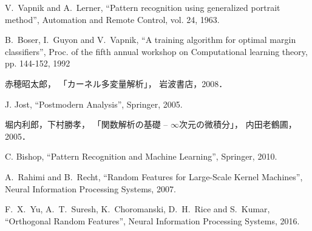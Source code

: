 %


\begin{thebibliography}{9}

V.~Vapnik and A.~Lerner,
``Pattern recognition using generalized portrait method'',
Automation and Remote Control, vol. 24, 1963.

B.~Boser, I.~Guyon and V.~Vapnik,
``A training algorithm for optimal margin classifiers'',
Proc. of the fifth annual workshop on Computational learning theory, pp. 144-152, 1992

赤穂昭太郎，
「カーネル多変量解析」，
岩波書店，2008．

J. Jost,
``Postmodern Analysis'',
Springer, 2005.

堀内利郎，下村勝孝，
「関数解析の基礎 -- $\infty $次元の微積分」，
内田老鶴圃，2005．

C. Bishop,
``Pattern Recognition and Machine Learning'',
Springer, 2010.

A.~Rahimi and B.~Recht, 
``Random Features for Large-Scale Kernel Machines'',
Neural Information Processing Systems, 2007.

F.~X.~Yu, A.~T.~Suresh, K.~Choromanski, D.~H.~Rice and S.~Kumar,
``Orthogonal Random Features'',
Neural Information Processing Systems, 2016.

\end{thebibliography}


